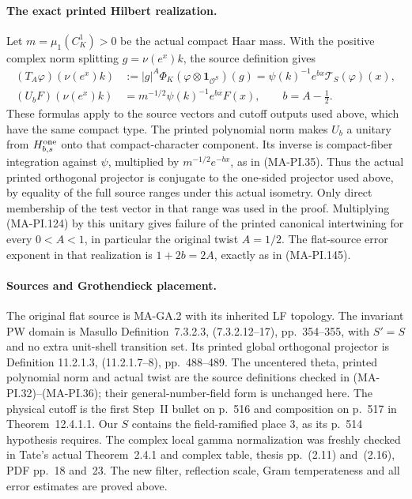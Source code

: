 \paragraph{The exact printed Hilbert realization.}
Let $m=\mu_1(C_K^1)>0$ be the actual compact Haar mass.
With the positive complex norm splitting
$g=\nu(e^x)k$, the source definition gives
\[
 \begin{split}
 (T_A\varphi)(\nu(e^x)k)
     &:=|g|^A\Phi_K(\varphi\otimes\mathbf1_{\mathcal O^{S}})(g)
       =\psi(k)^{-1}e^{bx}\mathcal T_S(\varphi)(x),\\
 (U_bF)(\nu(e^x)k)
     &=m^{-1/2}\psi(k)^{-1}e^{bx}F(x),
                    \qquad b=A-\tfrac12 .
 \end{split}
 \tag{MA-PI.148}
\]
These formulas apply to the source vectors and cutoff
outputs used above, which have the same compact type.
The printed polynomial norm makes $U_b$ a unitary
from $H^{\rm one}_{b,s}$ onto that compact-character
component.  Its inverse is compact-fiber integration
against $\psi$, multiplied by $m^{-1/2}e^{-bx}$,
as in (MA-PI.35).  Thus the actual printed orthogonal
projector is conjugate to the one-sided projector
used above, by equality of the full source ranges
under this actual isometry.  Only direct membership
of the test vector in that range was used in the proof.
Multiplying (MA-PI.124) by this unitary gives failure
of the printed canonical intertwining for every
$0<A<1$, in particular the original twist $A=1/2$.
The flat-source error exponent in that realization
is $1+2b=2A$, exactly as in (MA-PI.145).

\paragraph{Sources and Grothendieck placement.}
The original flat source is MA-GA.2 with its inherited
LF topology.  The invariant PW domain is Masullo
Definition~7.3.2.3, (7.3.2.12--17), pp.~354--355,
with $S'=S$ and no extra unit-shell transition set.
Its printed global orthogonal projector is Definition
11.2.1.3, (11.2.1.7--8), pp.~488--489.
The uncentered theta, printed polynomial norm and
actual twist are the source definitions checked in
(MA-PI.32)--(MA-PI.36); their general-number-field
form is unchanged here.  The physical cutoff is
the first Step~II bullet on p.~516 and composition
on p.~517 in Theorem~12.4.1.1.  Our $S$ contains
the field-ramified place $3$, as its p.~514
hypothesis requires.  The complex local gamma
normalization was freshly checked in Tate's actual
Theorem~2.4.1 and complex table, thesis pp.~(2.11)
and~(2.16), PDF pp.~18 and~23.  The new filter,
reflection scale, Gram temperateness and all error
estimates are proved above.

